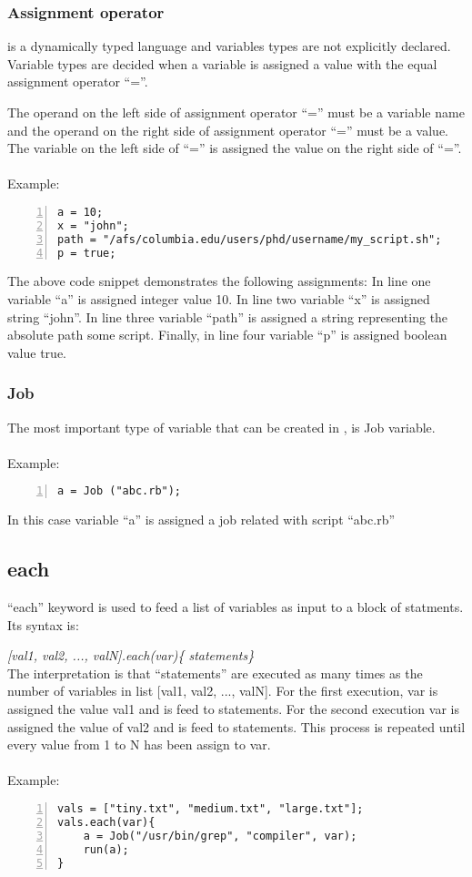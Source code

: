\subsubsection*{Assignment operator}
\lang{}  is a dynamically typed language and variables types are not explicitly declared.
Variable types are decided when a variable is assigned a value with the equal
assignment operator ``=''.

The operand on the left side of assignment operator ``='' must be a variable name
and the operand on the right side of assignment operator ``='' must be a value.
The variable on the left side of ``='' is assigned the value on the right side
of ``=''.\\
\\
Example:
\begin{Verbatim}[numbers=left]
a = 10;
x = "john";
path = "/afs/columbia.edu/users/phd/username/my_script.sh";
p = true;
\end{Verbatim}

The above code snippet demonstrates the following assignments:
In line one variable ``a'' is assigned integer value 10.
In line two variable ``x'' is assigned string ``john''.
In line three variable ``path'' is assigned a string representing the absolute path some script.
Finally, in line four variable ``p'' is assigned boolean value true.

\subsubsection*{Job}
The most important type of variable that can be created in \lang{}, is Job variable.\\
\\
Example:
\begin{Verbatim}[numbers=left]
a = Job ("abc.rb");
\end{Verbatim}
In this case variable ``a'' is assigned a job related with script ``abc.rb'' 

\subsection*{each}

\noindent ``each'' keyword is used to feed a list of variables as input
to a block of statments. Its syntax is:

\textit{[val1, val2, ..., valN].each(var)\{ statements\}}\\

The interpretation is that ``statements'' are executed as many times as the
number of variables in list [val1, val2, ..., valN]. For the first execution, var is assigned
the value val1 and is feed to statements. For the second execution var is assigned the value
of val2 and is feed to statements. This process is repeated until every value 
from 1 to N has been assign to var.\\
\\
Example:
\begin{Verbatim}[numbers=left]
vals = ["tiny.txt", "medium.txt", "large.txt"];
vals.each(var){
    a = Job("/usr/bin/grep", "compiler", var);
    run(a);
}
\end{Verbatim}

